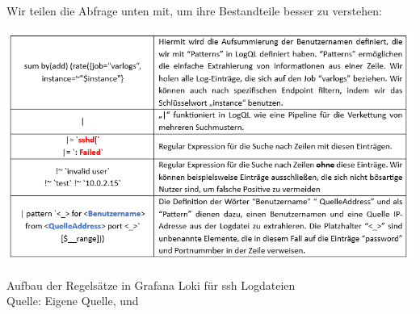 Wir teilen die Abfrage unten mit, um ihre Bestandteile besser zu verstehen: 
\begin{table}[H]
   \includegraphics[width=1\linewidth]{assets/tabelle_logql.png}
   \caption[Aufbau der Regelsätze in Grafana Loki für \gls{ssh} Logdateien]
   {Aufbau der Regelsätze in Grafana Loki für \gls{ssh} Logdateien \\Quelle: Eigene Quelle, \citep{VoidQuark_sshlogs} und \citep{Grafana_logql}}
\end{table}





